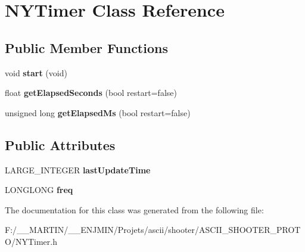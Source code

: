 \hypertarget{class_n_y_timer}{}\section{N\+Y\+Timer Class Reference}
\label{class_n_y_timer}
\subsection*{Public Member Functions}
\begin{DoxyCompactItemize}
\item 
\hypertarget{class_n_y_timer_a3a007c415b8d9c7beafc8e7cefb241f3}{}\label{class_n_y_timer_a3a007c415b8d9c7beafc8e7cefb241f3} 
void {\bfseries start} (void)
\item 
\hypertarget{class_n_y_timer_aa83feb5acbc7baa614b4a434d046aa7d}{}\label{class_n_y_timer_aa83feb5acbc7baa614b4a434d046aa7d} 
float {\bfseries get\+Elapsed\+Seconds} (bool restart=false)
\item 
\hypertarget{class_n_y_timer_abaf8b59d6edbb903fc4869c30787de48}{}\label{class_n_y_timer_abaf8b59d6edbb903fc4869c30787de48} 
unsigned long {\bfseries get\+Elapsed\+Ms} (bool restart=false)
\end{DoxyCompactItemize}
\subsection*{Public Attributes}
\begin{DoxyCompactItemize}
\item 
\hypertarget{class_n_y_timer_a4d8b0b7ff821cb4774f676a4422a9078}{}\label{class_n_y_timer_a4d8b0b7ff821cb4774f676a4422a9078} 
L\+A\+R\+G\+E\+\_\+\+I\+N\+T\+E\+G\+ER {\bfseries last\+Update\+Time}
\item 
\hypertarget{class_n_y_timer_a603b297ae9e287aeb9c4ca410d0fe949}{}\label{class_n_y_timer_a603b297ae9e287aeb9c4ca410d0fe949} 
L\+O\+N\+G\+L\+O\+NG {\bfseries freq}
\end{DoxyCompactItemize}


The documentation for this class was generated from the following file\+:\begin{DoxyCompactItemize}
\item 
F\+:/\+\_\+\+\_\+\+M\+A\+R\+T\+I\+N/\+\_\+\+\_\+\+E\+N\+J\+M\+I\+N/\+Projets/ascii/shooter/\+A\+S\+C\+I\+I\+\_\+\+S\+H\+O\+O\+T\+E\+R\+\_\+\+P\+R\+O\+T\+O/N\+Y\+Timer.\+h\end{DoxyCompactItemize}
